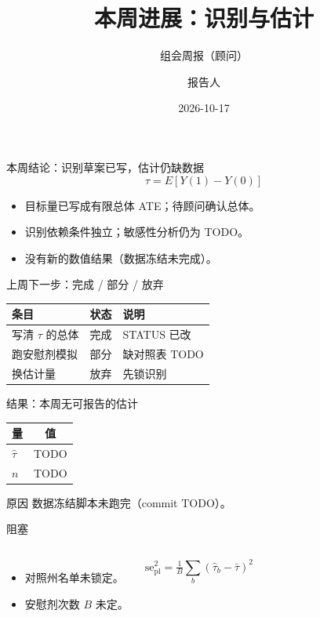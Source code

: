 \documentclass[aspectratio=169,10pt]{beamer}
\title{本周进展：识别与估计}
\subtitle{组会周报（顾问）}
\author{报告人}
\institute{研究组}
\date{2026-10-17}
\begin{document}
\begin{frame}
  \titlepage
\end{frame}

\begin{frame}{本周结论：识别草案已写，估计仍缺数据}
  \begin{equation*}
    \tau = E[Y(1)-Y(0)]
  \end{equation*}
  \begin{itemize}
    \item 目标量已写成有限总体 ATE；待顾问确认总体。
    \item 识别依赖条件独立；敏感性分析仍为 TODO。
    \item 没有新的数值结果（数据冻结未完成）。
  \end{itemize}
\end{frame}

\begin{frame}{上周下一步：完成 / 部分 / 放弃}
  \vspace{4pt}
  \begin{tabular}{lll}
    \toprule
    条目 & 状态 & 说明 \\
    \midrule
    写清 \(\tau\) 的总体 & 完成 & STATUS 已改 \\
    跑安慰剂模拟 & 部分 & 缺对照表 TODO \\
    换估计量 & 放弃 & 先锁识别 \\
    \bottomrule
  \end{tabular}
\end{frame}

\begin{frame}{结果：本周无可报告的估计}
  \vspace{4pt}
  \begin{tabular}{lc}
    \toprule
    量 & 值 \\
    \midrule
    \(\hat\tau\) & TODO \\
    \(n\) & TODO \\
    \bottomrule
  \end{tabular}
  \begin{block}{原因}
    数据冻结脚本未跑完（commit TODO）。
  \end{block}
\end{frame}

\begin{frame}{阻塞}
  \begin{columns}[T]
    \begin{itemize}
      \item 对照州名单未锁定。
      \item 安慰剂次数 \(B\) 未定。
    \end{itemize}
    \begin{equation*}
      \mathrm{se}_{\mathrm{pl}}^{2}
      = \tfrac{1}{B}\sum_{b}(\hat\tau_b-\bar\tau)^{2}
    \end{equation*}
  \end{columns}
\end{frame}
\end{document}
